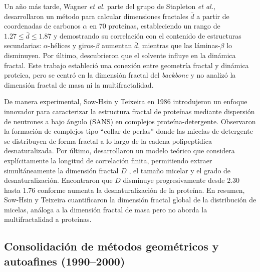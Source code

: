 Un año m\'{a}s tarde, Wagner \textit{et al.} \cite{Wagner1985} parte  del grupo de Stapleton \textit{et al.}, desarrollaron un m\'{e}todo para calcular dimensiones fractales $\bar{d}$ a partir de coordenadas de carbonos $\alpha$ en 70 prote\'{i}nas, estableciendo un rango de $1.27 \leq \bar{d} \leq 1.87$ y demostrando su correlaci\'{o}n con el contenido de estructuras secundarias: $\alpha$-h\'{e}lices y giros-$\beta$ aumentan $\bar{d}$, mientras que las l\'{a}minas-$\beta$ lo disminuyen. Por \'{u}ltimo, descubrieron que el solvente influye en la din\'{a}mica fractal. Este trabajo estableció una conexión entre geometría fractal y dinámica proteica, pero se centró en la dimensión fractal del \textit{backbone} y no analizó la dimensión fractal de masa ni la multifractalidad.

De manera experimental, Sow-Hsin y Teixeira \cite{Chen1986} en 1986 introdujeron un enfoque innovador para caracterizar la estructura fractal de prote\'{i}nas mediante dispersi\'{o}n de neutrones a bajo \'{a}ngulo (SANS) en complejos prote\'{i}na-detergente. Observaron la formaci\'{o}n de complejos tipo ``collar de perlas'' donde las micelas de detergente se distribuyen de forma fractal a lo largo de la cadena polipept\'{i}dica desnaturalizada. Por \'{u}ltimo, desarrollaron un modelo te\'{o}rico que considera expl\'{i}citamente la longitud de correlaci\'{o}n finita, permitiendo extraer simult\'{a}neamente la dimensi\'{o}n fractal $D$ , el tamaño micelar y el grado de desnaturalizaci\'{o}n. Encontraron que $D$ disminuye progresivamente desde 2.30 hasta 1.76 conforme aumenta la desnaturalizaci\'{o}n de la prote\'{i}na. En resumen, Sow-Hsin y Teixeira cuantificaron la dimensión fractal global de la distribución de micelas, análoga a la dimensión fractal de masa pero no aborda la multifractalidad a proteínas.


\subsection{Consolidaci\'{o}n de m\'{e}todos geom\'{e}tricos y autoafines (1990--2000)}
\label{subsec:cmga}


